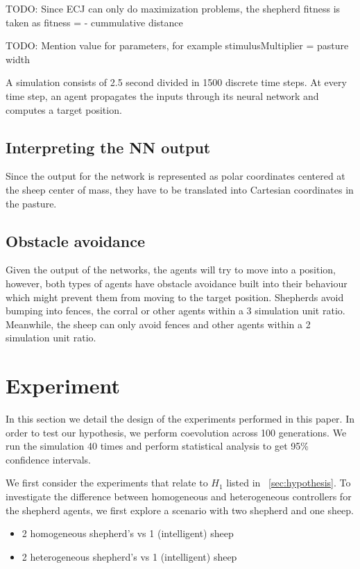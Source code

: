 \documentclass[conference]{IEEEtran}
\begin{document}
TODO: Since ECJ can only do maximization problems, the shepherd fitness is taken as 
fitness = - cummulative distance 

TODO: Mention value for parameters, for example stimulusMultiplier = pasture width

A simulation consists of 2.5 second divided in 1500 discrete time steps. At every time step, an agent propagates the inputs through its neural network and computes a target position. 

\subsection{Interpreting the NN output}
Since the output for the network is represented as polar coordinates centered at the sheep center of mass, they have to be translated into Cartesian coordinates in the pasture. 

\subsection{Obstacle avoidance}
Given the output of the networks, the agents will try to move into a position, however, both types of agents have obstacle avoidance built into their behaviour which might prevent them from moving to the target position. Shepherds avoid bumping into fences, the corral or other agents within a 3 simulation unit ratio. Meanwhile, the sheep can only avoid fences and other agents within a 2 simulation unit ratio. 



\section{Experiment}
\label{sec:experiment}
In this section we detail the design of the experiments performed in this paper. In order to test our hypothesis, we perform coevolution across 100 generations. We run the simulation 40 times and perform statistical analysis to get 95\% confidence intervals.


We first consider the experiments that relate to $H_1$ listed in ~\ref{sec:hypothesis}. To investigate the difference between homogeneous and heterogeneous controllers for the shepherd agents, we first explore a scenario with two shepherd and one sheep. 
\begin{itemize}
	\item 2 homogeneous shepherd’s vs 1 (intelligent) sheep
	\item 2 heterogeneous shepherd’s vs 1 (intelligent) sheep
\end{itemize}
 
\end{document}
